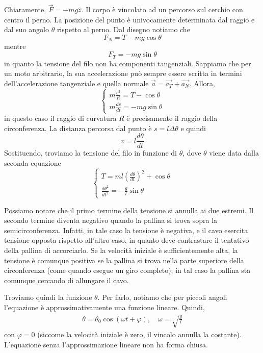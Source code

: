 \documentclass[a4paper]{article}
\begin{document}
Chiaramente, \(\vec{F} = -mg \hat{z}\).
Il corpo è vincolato ad un percorso sul cerchio con centro il perno.
La posizione del punto è univocamente determinata dal raggio e dal suo angolo \(\theta\)
rispetto al perno.
Dal disegno notiamo che
\[
    F_N = T - mg \cos\theta
\]
mentre
\[
    F_T = -mg\sin\theta
\]
in quanto la tensione del filo non ha componenti tangenziali.
Sappiamo che per un moto arbitrario, la sua accelerazione può sempre essere
scritta in termini dell'accelerazione tangenziale e quella normale \(\vec{a} = \vec{a_T} + \vec{a_N}\).
Allora,
\[
    \begin{cases}
        m\frac{v^2}{R} = T-\cos\theta \\
        m\frac{dv}{dt} = -mg\sin\theta
    \end{cases}
\]
in questo caso il raggio di curvatura \(R\) è precisamente il raggio della circonferenza.
La distanza percorsa dal punto è \(s=l\Delta \theta\) e quindi
\[
    v = l \frac{d\theta}{dt}
\]
Sostituendo, troviamo la tensione del filo in funzione di \(\theta\),
dove \(\theta\) viene data dalla seconda equazione
\[
    \begin{cases}
        T = ml{\left(\frac{d\theta}{dt}\right)}^2 + \cos\theta \\
        \frac{d\theta^2}{dt^2} = -\frac{g}{l}\sin\theta
    \end{cases}
\]

Possiamo notare che il primo termine della tensione
si annulla ai due estremi. Il secondo termine
diventa negativo quando la pallina si trova sopra la semicirconferenza.
Infatti, in tale caso la tensione è negativa, e il cavo esercita tensione opposta
rispetto all'altro caso, in quanto deve contrastare il tentativo della pallina di accorciarlo.
Se la velocità iniziale è sufficientemente alta, la tensione è comunque positiva
se la pallina si trova nella parte superiore della circonferenza (come quando esegue un giro completo),
in tal caso la pallina sta comunque cercando di allungare il cavo.

Troviamo quindi la funzione \(\theta\). Per farlo, notiamo che
per piccoli angoli l'equazione è approssimativamente una funzione lineare.
Quindi,
\begin{align*}
    \theta = \theta_0 \cos(\omega t + \varphi), \quad \omega = \sqrt{\frac{g}{l}}
\end{align*}
con \(\varphi = 0\) (siccome la velocità iniziale è zero, il vincolo annulla la costante).
L'equazione senza l'approssimazione lineare non ha forma chiusa.
\end{document}
